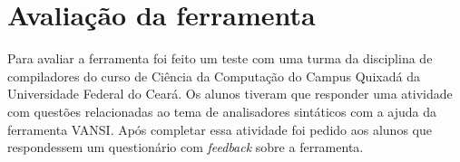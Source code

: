 


\section{Avaliação da ferramenta}
Para avaliar a ferramenta foi feito um teste com uma turma da disciplina de compiladores do curso de Ciência da Computação do Campus Quixadá da Universidade Federal do Ceará. Os alunos tiveram que responder uma atividade com questões relacionadas ao tema de analisadores sintáticos com a ajuda da ferramenta VANSI. Após completar essa atividade foi pedido aos alunos que respondessem um questionário com \textit{feedback} sobre a ferramenta.



